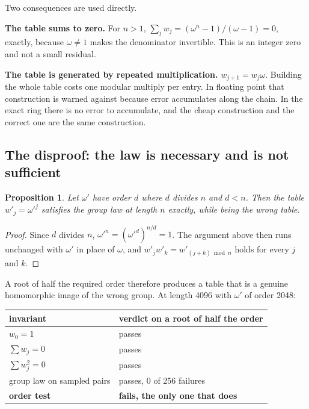 \documentclass{article}
\newtheorem{proposition}{Proposition}
\begin{document}
Two consequences are used directly.

\textbf{The table sums to zero.} For \(n > 1\), \(\sum_j w_j = (\omega^n - 1)/(\omega - 1) = 0\), exactly, because \(\omega \ne 1\) makes the denominator invertible. This is an integer zero and not a small residual.

\textbf{The table is generated by repeated multiplication.} \(w_{j+1} = w_j \omega\). Building the whole table costs one modular multiply per entry. In floating point that construction is warned against because error accumulates along the chain. In the exact ring there is no error to accumulate, and the cheap construction and the correct one are the same construction.

\subsection{The disproof: the law is necessary and is not sufficient}

\begin{proposition}
Let \(\omega'\) have order \(d\) where \(d\) divides \(n\) and \(d < n\). Then the table \(w'_j = \omega'^j\) satisfies the group law at length \(n\) exactly, while being the wrong table.
\end{proposition}

\begin{proof}
Since \(d\) divides \(n\), \(\omega'^n = (\omega'^d)^{n/d} = 1\). 
The argument above then runs unchanged with \(\omega'\) in place of \(\omega\), 
and \(w'_j w'_k = w'_{(j+k) \bmod n}\) holds for every \(j\) and \(k\).
\end{proof}

A root of half the required order therefore produces a table that is a genuine homomorphic image of the wrong group. At length 4096 with \(\omega'\) of order 2048:

\begin{center}
\begin{tabular}{@{}ll@{}}
\toprule
invariant & verdict on a root of half the order \\
\midrule
\(w_0 = 1\) & passes \\
\(\sum w_j = 0\) & passes \\
\(\sum w_j^2 = 0\) & passes \\
group law on sampled pairs & passes, 0 of 256 failures \\
\textbf{order test} & \textbf{fails, the only one that does} \\
\bottomrule
\end{tabular}
\end{center}
\end{document}
